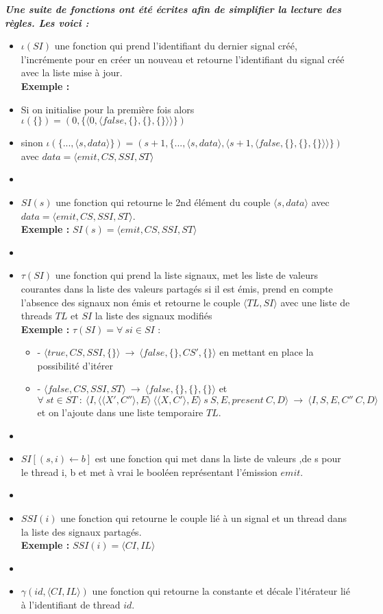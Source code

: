 \documentclass[10pt,a4paper]{report}
\begin{document}
\textbf{\textit{Une suite de fonctions ont été écrites afin de simplifier la lecture des règles. Les voici :}}
\smallbreak
\begin{itemize}
\item[] $\iota(SI)$ une fonction qui prend l'identifiant du dernier signal créé, l'incrémente pour en créer un nouveau et retourne l'identifiant du signal créé avec la liste mise à jour.
  \\ \textbf{Exemple :} 
\item[] Si on initialise pour la première fois alors $\iota(\{\}) = (0 ,\{\langle 0,\langle false,\{\},\{\},\{\}\rangle\rangle\})$
\item[] sinon $\iota(\{...,\langle s,data\rangle\}) = (s+1 ,\{...,\langle s,data\rangle,\langle s+1,\langle false,\{\},\{\},\{\}\rangle\rangle\})$ avec $data = \langle emit,CS,SSI,ST\rangle$
\item[] 
\item[] $SI(s)$ une fonction qui retourne le 2nd élément du couple $\langle s,data\rangle$ avec $data = \langle emit,CS,SSI,ST\rangle$.
  \\\textbf{Exemple :} $SI(s) = \langle emit,CS,SSI,ST\rangle$
\item[]  
\item[] $\tau(SI)$ une fonction qui prend la liste signaux, met les liste de valeurs courantes dans la liste des valeurs partagés si il est émis, prend en compte l'absence des signaux non émis et retourne le couple $\langle TL,SI \rangle$ avec une liste de threads $TL$ et $SI$ la liste des signaux modifiés 
  \\ \textbf{Exemple :} $\tau(SI) = \forall~si \in SI$ : 
  \begin{itemize}
  \item[] - $\langle true,CS,SSI,\{\}\rangle~\rightarrow~\langle false,\{\},CS',\{\}\rangle$ en mettant en place la possibilité d'itérer
  \item[] - $\langle false,CS,SSI,ST\rangle~\rightarrow~\langle false,\{\},\{\},\{\}\rangle$ et 
    \\$\forall~st \in ST~:~\langle I,\langle\langle X',C''\rangle, E\rangle~\langle\langle X,C'\rangle, E\rangle~s~S,E,present~C,D\rangle~\rightarrow~\langle I,S,E,C''~C,D\rangle$ et on l'ajoute dans une liste temporaire $TL$.
  \end{itemize}
\item[]
\item[] $SI[(s,i) \leftarrow b]$ est une fonction qui met dans la liste de valeurs ,de s pour le thread i, b et met à vrai le booléen représentant l'émission $emit$.
\item[] 
\item[] $SSI(i)$ une fonction qui retourne le couple lié à un signal et un thread dans la liste des signaux partagés.
  \\ \textbf{Exemple :} $SSI(i) = \langle CI,IL\rangle$
\item[] 
\item[] $\gamma(id,\langle CI,IL\rangle)$ une fonction qui retourne la constante et décale l'itérateur lié à l'identifiant de thread $id$.
\end{itemize}
\bigbreak
\end{document}
